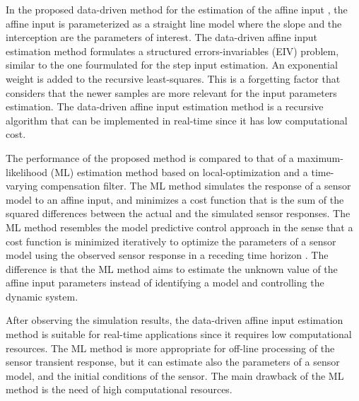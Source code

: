 In the proposed data-driven method for the estimation of the affine input \citep{QuintanaMEAS},
the affine input is parameterized as a straight line model where the slope and the interception are the parameters of interest.
The data-driven affine input estimation method formulates a structured errors-invariables (EIV) problem, similar to the one fourmulated for the step input estimation.
An exponential weight is added to the recursive least-squares.
This is a forgetting factor that considers that the newer samples are more relevant for the input parameters estimation.
The data-driven affine input estimation method is a recursive algorithm that can be implemented in real-time since it has low computational cost.

The performance of the proposed method is compared to that of a maximum-likelihood (ML) estimation method based on local-optimization and a time-varying compensation filter.
The ML method simulates the response of a sensor model to an affine input, and minimizes a cost function that is the sum of the squared differences between the actual and the simulated sensor responses. 
The ML method resembles the model predictive control approach in the sense that a cost function is minimized iteratively to optimize the parameters of a sensor model using the observed sensor response in a receding time horizon \citep{Mayne14}.
The difference is that the ML method aims to estimate the unknown value of the affine input parameters instead of identifying a model and controlling the dynamic system. 
 
After observing the simulation results, the data-driven affine input estimation method is suitable for real-time applications since it requires low computational resources. 
The ML method is more appropriate for off-line processing of the sensor transient response, but
it can estimate also the parameters of a sensor model, and the initial conditions of the sensor.
The main drawback of the ML method is the need of high computational resources.


 
\newpage
